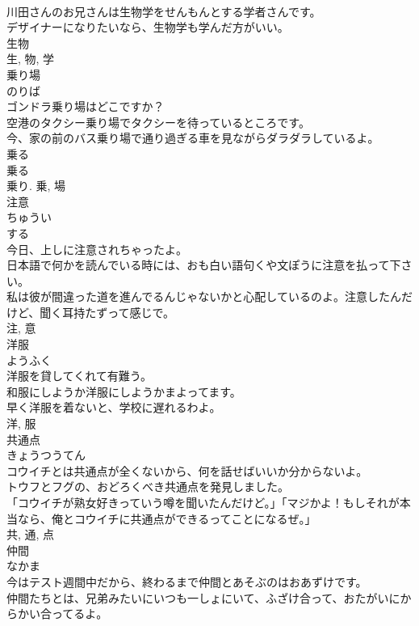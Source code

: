 \documentclass[8pt]{extreport}
\begin{document}
\begin{CJK}{UTF8}{min}
\\	川田さんのお兄さんは生物学をせんもんとする学者さんです。	
\\	デザイナーになりたいなら、生物学も学んだ方がいい。	
\\	生物 
\\	生, 物, 学	
\\	乗り場	
\\	のりば	
\\	ゴンドラ乗り場はどこですか？	
\\	空港のタクシー乗り場でタクシーを待っているところです。	
\\	今、家の前のバス乗り場で通り過ぎる車を見ながらダラダラしているよ。	
\\	乗る 
\\	乗る 
\\	乗り.	乗, 場	
\\	注意	
\\	ちゅうい	
\\	する 
\\	今日、上しに注意されちゃったよ。	
\\	日本語で何かを読んでいる時には、おも白い語句くや文ぽうに注意を払って下さい。	
\\	私は彼が間違った道を進んでるんじゃないかと心配しているのよ。注意したんだけど、聞く耳持たずって感じで。	
\\	注, 意	
\\	洋服	
\\	ようふく	
\\	洋服を貸してくれて有難う。	
\\	和服にしようか洋服にしようかまよってます。	
\\	早く洋服を着ないと、学校に遅れるわよ。	
\\	洋, 服	
\\	共通点	
\\	きょうつうてん	
\\	コウイチとは共通点が全くないから、何を話せばいいか分からないよ。	
\\	トウフとフグの、おどろくべき共通点を発見しました。	
\\	「コウイチが熟女好きっていう噂を聞いたんだけど。」「マジかよ！もしそれが本当なら、俺とコウイチに共通点ができるってことになるぜ。」	
\\	共, 通, 点	
\\	仲間	
\\	なかま	
\\	今はテスト週間中だから、終わるまで仲間とあそぶのはおあずけです。	
\\	仲間たちとは、兄弟みたいにいつも一しょにいて、ふざけ合って、おたがいにからかい合ってるよ。	

\end{CJK}
\end{document}
